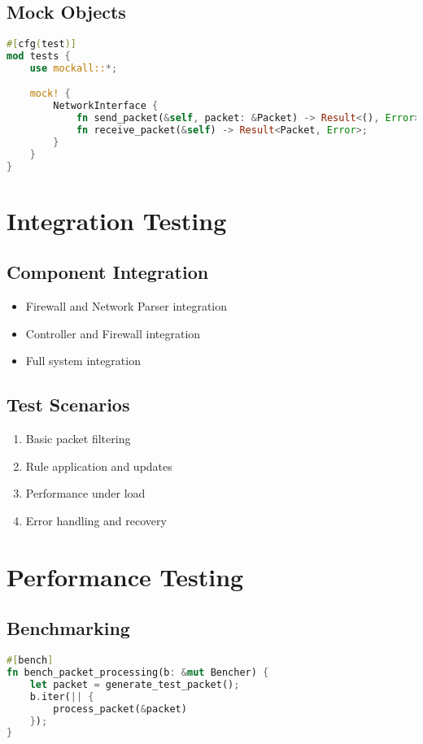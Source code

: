 \documentclass{article}
\begin{document}
\subsection{Mock Objects}
\begin{lstlisting}[language=rust]
#[cfg(test)]
mod tests {
    use mockall::*;

    mock! {
        NetworkInterface {
            fn send_packet(&self, packet: &Packet) -> Result<(), Error>;
            fn receive_packet(&self) -> Result<Packet, Error>;
        }
    }
}
\end{lstlisting}

\section{Integration Testing}

\subsection{Component Integration}
\begin{itemize}
    \item Firewall and Network Parser integration
    \item Controller and Firewall integration
    \item Full system integration
\end{itemize}

\subsection{Test Scenarios}
\begin{enumerate}[label=\arabic*.]
    \item Basic packet filtering
    \item Rule application and updates
    \item Performance under load
    \item Error handling and recovery
\end{enumerate}

\section{Performance Testing}

\subsection{Benchmarking}
\begin{lstlisting}[language=rust]
#[bench]
fn bench_packet_processing(b: &mut Bencher) {
    let packet = generate_test_packet();
    b.iter(|| {
        process_packet(&packet)
    });
}
\end{lstlisting}
\end{document}

